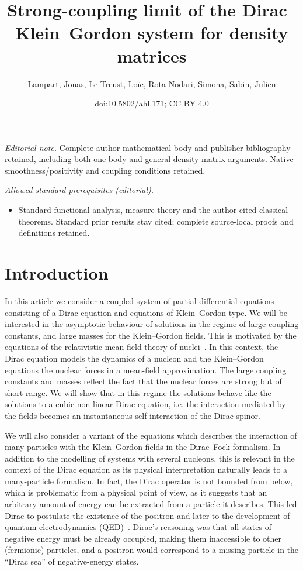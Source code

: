 \documentclass[10pt]{amsart}
\title{Strong-coupling limit of the Dirac–Klein–Gordon system for density matrices}
\author{Lampart, Jonas, Le Treust, Loïc, Rota Nodari, Simona, Sabin, Julien}
\date{doi:10.5802/ahl.171; CC BY 4.0}
\theoremstyle{definition}\newtheorem{defi}[theo]{Definition}\newtheorem{rema}[theo]{Remark}\newtheorem{exam}[theo]{Example}\newtheorem{exem}[theo]{Example}\newtheorem{nota}[theo]{Notation}
\begin{document}
\maketitle
\noindent\textit{Editorial note.} Complete author mathematical body and publisher bibliography retained, including both one-body and general density-matrix arguments. Native smoothness/positivity and coupling conditions retained.\par\medskip
\noindent\textit{Allowed standard prerequisites (editorial).}\begin{itemize}
\item Standard functional analysis, measure theory and the author-cited classical theorems. Standard prior results stay cited; complete source-local proofs and definitions retained.
\end{itemize}\medskip

\section{Introduction}

In this article we consider a coupled system of partial differential equations consisting of a Dirac equation and equations of Klein--Gordon type. We will be interested in the asymptotic behaviour of solutions in the regime of large coupling constants, and large masses for the Klein--Gordon fields. This is motivated by the equations of the relativistic mean-field theory of nuclei~\cite{Ring-96}. In this context, the Dirac equation models the dynamics of a nucleon and the Klein--Gordon equations the nuclear forces in a mean-field approximation. The large coupling constants and masses reflect the fact that the nuclear forces are strong but of short range. We will show that in this regime the solutions behave like the solutions to a cubic non-linear Dirac equation, i.e. the interaction mediated by the fields becomes an instantaneous self-interaction of the Dirac spinor.

We will also consider a variant of the equations which describes the interaction of many particles with the Klein--Gordon fields in the Dirac--Fock formalism. In addition to the modelling of systems with several nucleons, this is relevant in the context of the Dirac equation as its physical interpretation naturally leads to a many-particle formalism. In fact, the Dirac operator is not bounded from below, which is problematic from a physical point of view, as it suggests that an arbitrary amount of energy can be extracted from a particle it describes. This led Dirac to postulate the existence of the positron and later to the development of quantum electrodynamics (QED)~\cite{dirac1928quantum,dirac1928quantumII}. Dirac's reasoning was that all states of negative energy must be already occupied, making them inaccessible to other (fermionic) particles, and a positron would correspond to a missing particle in the ``Dirac sea'' of negative-energy states.
\end{document}
